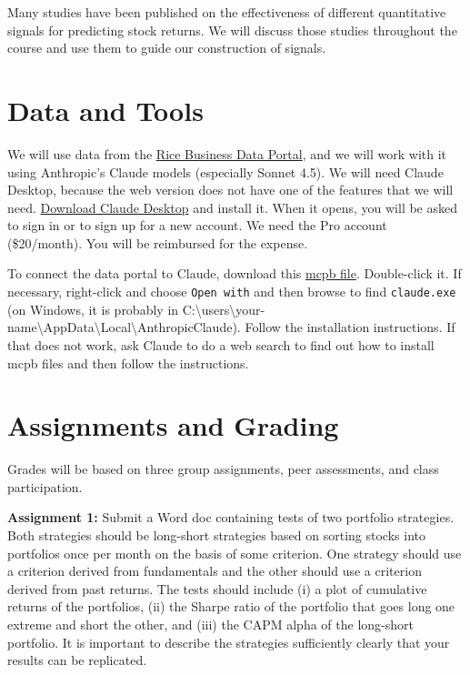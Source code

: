 \documentclass[11pt]{article}
\begin{document}
Many studies have been published on the effectiveness of different quantitative signals for predicting stock returns. We will discuss those studies throughout the course and use them to guide our construction of signals.

\section{Data and Tools}

We will use data from the \href{https://data-portal.rice-business.org}{Rice Business Data Portal}, and we will work with it using Anthropic's Claude models (especially Sonnet 4.5). We will need Claude Desktop, because the web version does not have one of the features that we will need. \href{https://claude.ai/download}{Download Claude Desktop} and install it. When it opens, you will be asked to sign in or to sign up for a new account. We need the Pro account (\$20/month). You will be reimbursed for the expense.

To connect the data portal to Claude, download this \href{rice-stock-data.mcpb}{mcpb file}. Double-click it. If necessary, right-click and choose \texttt{Open with} and then browse to find \texttt{claude.exe} (on Windows, it is probably in C:\textbackslash users\textbackslash your-name\textbackslash AppData\textbackslash Local\textbackslash AnthropicClaude). Follow the installation instructions. If that does not work, ask Claude to do a web search to find out how to install mcpb files and then follow the instructions.

\section{Assignments and Grading}

Grades will be based on three group assignments, peer assessments, and class participation.

\vspace{1em}

\textbf{Assignment 1:} Submit a Word doc containing tests of two portfolio strategies. Both strategies should be long-short strategies based on sorting stocks into portfolios once per month on the basis of some criterion. One strategy should use a criterion derived from fundamentals and the other should use a criterion derived from past returns. The tests should include (i) a plot of cumulative returns of the portfolios, (ii) the Sharpe ratio of the portfolio that goes long one extreme and short the other, and (iii) the CAPM alpha of the long-short portfolio. It is important to describe the strategies sufficiently clearly that your results can be replicated.
\end{document}

